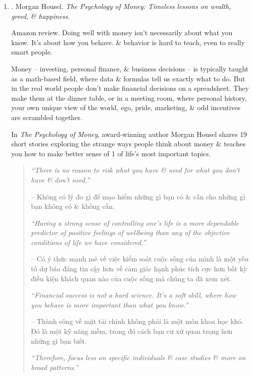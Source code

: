 \documentclass{article}
\begin{document}
\begin{enumerate}
	\item \cite{Housel_money}. {\sc Morgan Housel}. {\it The Psychology of Money: Timeless lessons on wealth, greed, \& happiness}. {}
	
	{\sf Amazon review.} Doing well with money isn't necessarily about what you know. It's about how you behave. \& behavior is hard to teach, even to really smart people.
	
	Money -- investing, personal finance, \& business decisions -- is typically taught as a math-based field, where data \& formulas tell us exactly what to do. But in the real world people don't make financial decisions on a spreadsheet. They make them at the dinner table, or in a meeting room, where personal history, your own unique view of the world, ego, pride, marketing, \& odd incentives are scrambled together.
	
	In {\it The Psychology of Money}, award-winning author {\sc Morgan Housel} shares 19 short stories exploring the strange ways people think about money \& teaches you how to make better sense of 1 of life's most important topics.
	\begin{quotation}
		{\it``There is no reason to risk what you have \& need for what you don't have \& don't need.''}
		
		-- Không có lý do gì để mạo hiểm những gì bạn có \& cần cho những gì bạn không có \& không cần.
		
		{\it``Having a strong sense of controlling one's life is a more dependable predictor of positive feelings of wellbeing than any of the objective conditions of life we have considered.''}
		
		-- Có ý thức mạnh mẽ về việc kiểm soát cuộc sống của mình là một yếu tố dự báo đáng tin cậy hơn về cảm giác hạnh phúc tích cực hơn bất kỳ điều kiện khách quan nào của cuộc sống mà chúng ta đã xem xét.
		
		{\it``Financial success is not a hard science. It's a soft skill, where how you behave is more important than what you know.''}
		
		-- Thành công về mặt tài chính không phải là một môn khoa học khó. Đó là một kỹ năng mềm, trong đó cách bạn cư xử quan trọng hơn những gì bạn biết.
		
		{\it``Therefore, focus less on specific individuals \& case studies \& more on broad patterns.''}
		

\end{quotation}
\end{enumerate}
\end{document}
